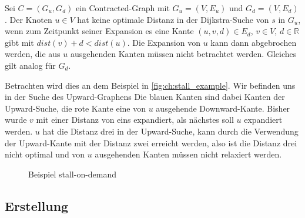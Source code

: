 \begin{definition}
    Sei $C = (G_u, G_d)$ ein Contracted-Graph mit $G_u = (V, E_u)$ und $G_d = (V, E_d)$.
    Der Knoten $u \in V$ hat keine optimale Distanz in der Dijkstra-Suche von $s$ in $G_u$, wenn zum Zeitpunkt seiner Expansion es eine Kante $(u, v, d) \in E_d$, $v \in V$, $d \in \mathbb{R}$ gibt mit ${dist}(v) + d < {dist}(u)$.
    Die Expansion von $u$ kann dann abgebrochen werden, die aus $u$ ausgehenden Kanten müssen nicht betrachtet werden.
    Gleiches gilt analog für $G_d$.
\end{definition}

Betrachten wird dies an dem Beispiel in \autoref{fig:ch:stall_example}.
Wir befinden uns in der Suche des Upward-Graphens
Die blauen Kanten sind dabei Kanten der Upward-Suche, die rote Kante eine von $u$ ausgehende Downward-Kante.
Bisher wurde $v$ mit einer Distanz von eins expandiert, als nächstes soll $u$ expandiert werden.
$u$ hat die Distanz drei in der Upward-Suche, kann durch die Verwendung der Upward-Kante mit der Distanz zwei erreicht werden, also ist die Distanz drei nicht optimal und von $u$ ausgehenden Kanten müssen nicht relaxiert werden.

\begin{figure}
    \centering
    \caption{Beispiel stall-on-demand}
    \label{fig:ch:stall_example}
\end{figure}

\subsection{Erstellung}

